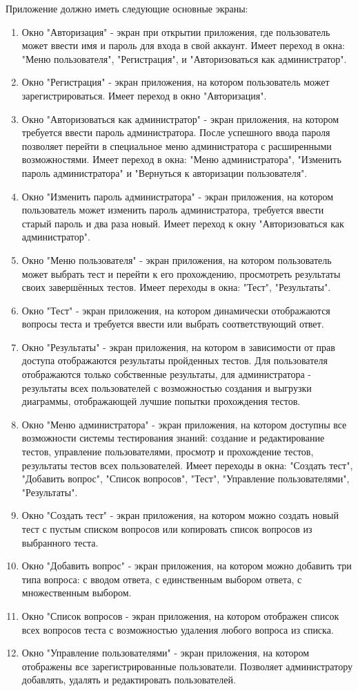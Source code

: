 Приложение должно иметь следующие основные экраны:
\begin{enumerate}
	\item Окно "Авторизация" - экран при открытии приложения, где пользователь может ввести имя и пароль для входа в свой аккаунт. Имеет переход в окна: "Меню пользователя", "Регистрация",  и "Авторизоваться как администратор".
	\item Окно "Регистрация" - экран приложения, на котором пользователь может зарегистрироваться. Имеет переход в окно "Авторизация".
	\item Окно "Авторизоваться как администратор" - экран приложения, на котором требуется ввести пароль администратора. После успешного ввода пароля позволяет перейти в специальное меню администратора с расширенными возможностями. Имеет переход в окна: "Меню администратора", "Изменить пароль администратора" и "Вернуться к авторизации пользователя".
	\item Окно "Изменить пароль администратора" - экран приложения, на котором пользователь может изменить пароль администратора, требуется ввести старый пароль и два раза новый. Имеет переход к окну "Авторизоваться как администратор".
	\item Окно "Меню пользователя" - экран приложения, на котором пользователь может выбрать тест и перейти к его прохождению, просмотреть результаты своих завершённых тестов. Имеет переходы в окна: "Тест", "Результаты".
	\item Окно "Тест" - экран приложения, на котором динамически отображаются вопросы теста и требуется ввести или выбрать соответствующий ответ.
	\item Окно "Результаты" - экран приложения, на котором в зависимости от прав доступа отображаются результаты пройденных тестов. Для пользователя отображаются только собственные результаты, для администратора - результаты всех пользователей с возможностью создания и выгрузки диаграммы, отображающей лучшие попытки прохождения тестов.
	\item Окно "Меню администратора" - экран приложения, на котором доступны все возможности системы тестирования знаний: создание и редактирование тестов, управление пользователями, просмотр и прохождение тестов, результаты тестов всех пользователей. Имеет переходы в окна: "Создать тест", "Добавить вопрос", "Список вопросов", "Тест", "Управление пользователями", "Результаты".
	\item Окно "Создать тест" - экран приложения, на котором можно создать новый тест с пустым списком вопросов или копировать список вопросов из выбранного теста. 
	\item Окно "Добавить вопрос" - экран приложения, на котором можно добавить три типа вопроса: с вводом ответа, с единственным выбором ответа, с множественным выбором.
	\item Окно "Список вопросов - экран приложения, на котором отображен список всех вопросов теста с возможностью удаления любого вопроса из списка.
	\item Окно "Управление пользователями" - экран приложения, на котором отображены все зарегистрированные пользователи. Позволяет администратору добавлять, удалять и редактировать пользователей.
\end{enumerate}

